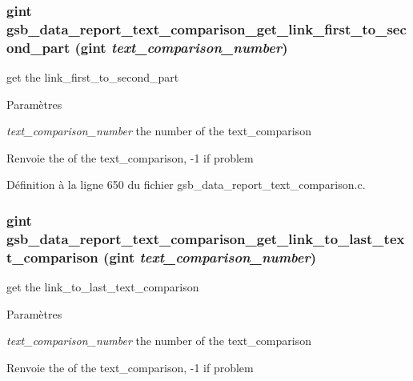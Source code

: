 \subsubsection[{gsb\_\-data\_\-report\_\-text\_\-comparison\_\-get\_\-link\_\-first\_\-to\_\-second\_\-part}]{\setlength{\rightskip}{0pt plus 5cm}gint gsb\_\-data\_\-report\_\-text\_\-comparison\_\-get\_\-link\_\-first\_\-to\_\-second\_\-part (gint {\em text\_\-comparison\_\-number})}\label{gsb__data__report__text__comparison_8c_a8d68df97e25aace4a4809dd9f96819ab}
get the link\_\-first\_\-to\_\-second\_\-part


\begin{DoxyParams}{Paramètres}
\item[{\em text\_\-comparison\_\-number}]the number of the text\_\-comparison\end{DoxyParams}
\begin{DoxyReturn}{Renvoie}
the of the text\_\-comparison, -\/1 if problem 
\end{DoxyReturn}


Définition à la ligne 650 du fichier gsb\_\-data\_\-report\_\-text\_\-comparison.c.

\subsubsection[{gsb\_\-data\_\-report\_\-text\_\-comparison\_\-get\_\-link\_\-to\_\-last\_\-text\_\-comparison}]{\setlength{\rightskip}{0pt plus 5cm}gint gsb\_\-data\_\-report\_\-text\_\-comparison\_\-get\_\-link\_\-to\_\-last\_\-text\_\-comparison (gint {\em text\_\-comparison\_\-number})}\label{gsb__data__report__text__comparison_8c_a7fd2e0a0543f8b47fd26394c8924f94d}
get the link\_\-to\_\-last\_\-text\_\-comparison


\begin{DoxyParams}{Paramètres}
\item[{\em text\_\-comparison\_\-number}]the number of the text\_\-comparison\end{DoxyParams}
\begin{DoxyReturn}{Renvoie}
the of the text\_\-comparison, -\/1 if problem 
\end{DoxyReturn}


